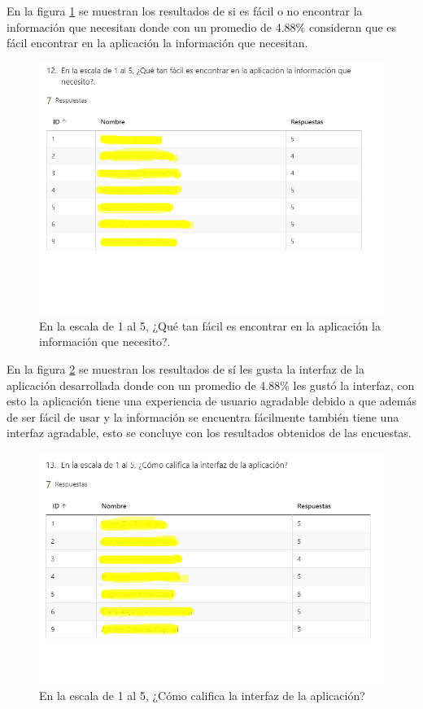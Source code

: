 En la figura \ref{fig:falic} se muestran los resultados de si es fácil o no encontrar la información que necesitan donde con un promedio de 4.88\% consideran que es fácil encontrar en la aplicación la información que necesitan.
\begin{figure}[H]
	\centering
	\includegraphics[scale=0.4]{Capitulo5/imagenes/13}
	\caption{En la escala de 1 al 5, ¿Qué tan fácil es encontrar en la aplicación la información que necesito?.}
	\label{fig:falic}
\end{figure}

En la figura \ref{fig:inter} 
se muestran los resultados de sí  les gusta la interfaz de la aplicación desarrollada donde con un promedio de 4.88\% les gustó la interfaz, con esto la aplicación tiene una experiencia de usuario agradable debido a que además de ser fácil de usar y la información se encuentra fácilmente también tiene una interfaz agradable, esto se concluye con los resultados obtenidos de las encuestas.
\begin{figure}[H]
	\centering
	\includegraphics[scale=0.3]{Capitulo5/imagenes/14}
	\caption{En la escala de 1 al 5, ¿Cómo califica la interfaz de la aplicación?}
	\label{fig:inter}
\end{figure}



